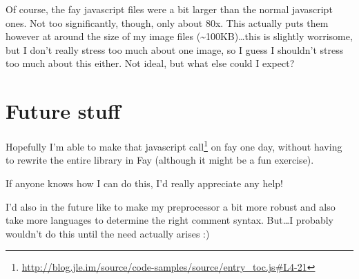 \documentclass[]{article}
\renewcommand{\href}[2]{#2\footnote{\url{#1}}}
\begin{document}
Of course, the fay javascript files were a bit larger than the normal
javascript ones. Not too significantly, though, only about 80x. This
actually puts them however at around the size of my image files
(\textasciitilde{}100KB)\ldots{}this is slightly worrisome, but I don't
really stress too much about one image, so I guess I shouldn't stress
too much about this either. Not ideal, but what else could I expect?

\section{Future stuff}\label{future-stuff}

Hopefully I'm able to make
\href{http://blog.jle.im/source/code-samples/source/entry_toc.js\#L4-21}{that
javascript call} on fay one day, without having to rewrite the entire
library in Fay (although it might be a fun exercise).

If anyone knows how I can do this, I'd really appreciate any help!

I'd also in the future like to make my preprocessor a bit more robust
and also take more languages to determine the right comment syntax.
But\ldots{}I probably wouldn't do this until the need actually arises :)
\end{document}
